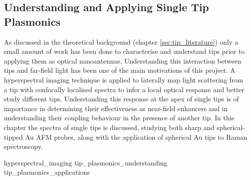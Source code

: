 \documentclass[12pt, a4paper, oneside]{book}
\begin{document}
\begin{singlespace}
\color{white}
\chapter{Understanding and Applying Single Tip Plasmonics}
\label{ch:tip_plasmonics}
\end{singlespace}


As discussed in the theoretical background (chapter \ref{sec:tip_literature}) only a small amount of work has been done to characterise and understand tips prior to applying them as optical nanoantennae. Understanding this interaction between tips and far-field light has been one of the main motivations of this project. A hyperspectral imaging technique is applied to laterally map light scattering from a tip with confocally localised spectra to infer a local optical response and better study different tips. Understanding this response at the apex of single tips is of importance in determining their effectiveness as near-field enhancers and in understanding their coupling behaviour in the presence of another tip. In this chapter the spectra of single tips is discussed, studying both sharp and spherical-tipped Au AFM probes, along with the application of spherical Au tips to Raman spectroscopy.

{hyperspectral_imaging}
{tip_plasmonics_understanding}
{tip_plasmonics_applications}
\end{document}
